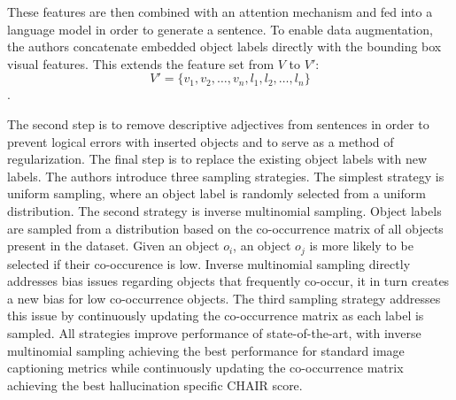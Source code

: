These features are then combined with an attention mechanism and fed into a language model in order to generate a sentence. To enable data augmentation, the authors concatenate embedded object labels directly with the bounding box visual features. This extends the feature set from $V$ to $V'$: $$V' = \{v_1, v_2, \dots, v_n, l_1, l_2, \dots, l_n\}$$.

The second step is to remove descriptive adjectives from sentences in order to prevent logical errors with inserted objects and to serve as a method of regularization. The final step is to replace the existing object labels with new labels. The authors introduce three sampling strategies. The simplest strategy is uniform sampling, where an object label is randomly selected from a uniform distribution. The second strategy is inverse multinomial sampling. Object labels are sampled from a distribution based on the co-occurrence matrix of all objects present in the dataset. Given an object $o_i$, an object $o_j$ is more likely to be selected if their co-occurence is low. Inverse multinomial sampling directly addresses bias issues regarding objects that frequently co-occur, it in turn creates a new bias for low co-occurrence objects. The third sampling strategy addresses this issue by continuously updating the co-occurrence matrix as each label is sampled. All strategies improve performance of state-of-the-art, with inverse multinomial sampling achieving the best performance for standard image captioning metrics while continuously updating the co-occurrence matrix achieving the best hallucination specific CHAIR score.

